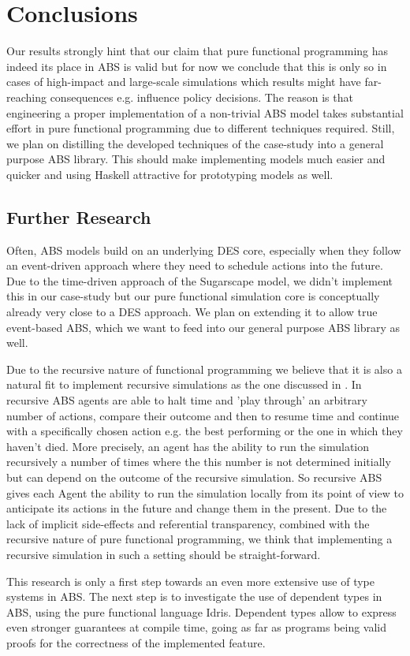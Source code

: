 \section{Conclusions}
\label{sec:conclusions}
Our results strongly hint that our claim that pure functional programming has indeed its place in ABS is valid but for now we conclude that this is only so in cases of high-impact and large-scale simulations which results might have far-reaching consequences e.g. influence policy decisions. The reason is that engineering a proper implementation of a non-trivial ABS model takes substantial effort in pure functional programming due to different techniques required. Still, we plan on distilling the developed techniques of the case-study into a general purpose ABS library. This should make implementing models much easier and quicker and using Haskell attractive for prototyping models as well.

\subsection{Further Research}
Often, ABS models build on an underlying DES core, especially when they follow an event-driven approach \cite{meyer_event-driven_2014} where they need to schedule actions into the future. Due to the time-driven approach of the Sugarscape model, we didn't implement this in our case-study but our pure functional simulation core is conceptually already very close to a DES approach. We plan on extending it to allow true event-based ABS, which we want to feed into our general purpose ABS library as well.

Due to the recursive nature of functional programming we believe that it is also a natural fit to implement recursive simulations as the one discussed in \cite{gilmer_recursive_2000}. In recursive ABS agents are able to halt time and 'play through' an arbitrary number of actions, compare their outcome and then to resume time and continue with a specifically chosen action e.g. the best performing or the one in which they haven't died. More precisely, an agent has the ability to run the simulation recursively a number of times where the this number is not determined initially but can depend on the outcome of the recursive simulation. So recursive ABS gives each Agent the ability to run the simulation locally from its point of view to anticipate its actions in the future and change them in the present. Due to the lack of implicit side-effects and referential transparency, combined with the recursive nature of pure functional programming, we think that implementing a recursive simulation in such a setting should be straight-forward.

This research is only a first step towards an even more extensive use of type systems in ABS. The next step is to investigate the use of dependent types in ABS, using the pure functional language Idris. Dependent types allow to express even stronger guarantees at compile time, going as far as programs being valid proofs for the correctness of the implemented feature.